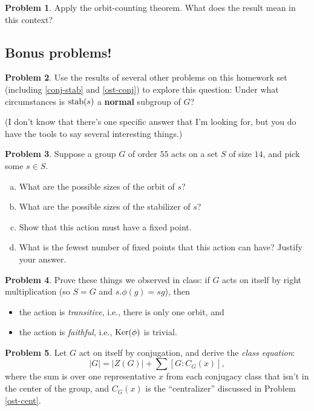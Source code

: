 \documentclass[12pt]{article}
\theoremstyle{definition} %
\newtheorem{problem}{Problem}
\begin{document}
  \begin{problem}
    Apply the orbit-counting theorem. What does the result mean in this context?
  \end{problem}

\subsection*{Bonus problems!}
  

\begin{problem}
  Use the results of several other problems on this homework set (including \ref{conj-stab} and \ref{ost-conj}) to explore this question: Under what circumstances is $\operatorname{stab}(s)$ a \textbf{normal} subgroup of $G$?

  (I don't know that there's one specific answer that I'm looking for, but you do have the tools to say several interesting things.)
\end{problem}

\begin{problem}
  Suppose a group $G$ of order $55$ acts on a set $S$ of size
  $14$, and pick some $s\in S$.
  \begin{enumerate}[(a)]
  \item What are the possible sizes of the orbit of $s$?
  \item What are the possible sizes of the stabilizer of $s$?
  \item Show that this action must have a fixed point.
  \item What is the fewest number of fixed points that this action can
    have? Justify your answer.
  \end{enumerate}
\end{problem}

\begin{problem}
  Prove these things we observed in class: if $G$ acts on itself by right multiplication (so $S = G$ and $s.\phi(g) = sg$), then
  \begin{itemize}
    \item the action is \textit{transitive}, i.e., there is only one orbit, and
    \item the action is \textit{faithful}, i.e., $\operatorname{Ker}(\phi)$ is trivial.
  \end{itemize}
\end{problem}

\begin{problem}
  Let $G$ act on itself by conjugation, and derive the \textit{class equation}:
  \[|G| = |Z(G)| + \sum [G:C_G(x)],\]
  where the sum is over one representative $x$ from each conjugacy class that isn't in the center of the group, and $C_G(x)$ is the ``centralizer'' discussed in Problem \ref{ost-cent}.
\end{problem}
\end{document}
